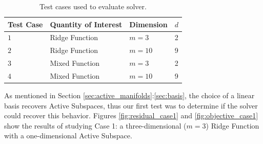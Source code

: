 \documentclass[]{aiaa-tc}%
\begin{document}
\begin{table}
\centering
\begin{tabular}{llll}
\toprule
Test Case & Quantity of Interest & Dimension & $d$\\
\midrule
$1$ & Ridge Function & $m=3$ & 2 \\
$2$ & Ridge Function & $m=10$ & 9 \\
$3$ & Mixed Function & $m=3$ & 2 \\
$4$ & Mixed Function & $m=10$ & 9 \\
\bottomrule
\end{tabular}
\caption{Test cases used to evaluate solver.}
\label{tab:tests}
\end{table}

As mentioned in Section \ref{sec:active_manifolds}:\ref{sec:basis}, the choice of a linear basis recovers Active Subspaces, thus our first test was to determine if the solver could recover this behavior. Figures \ref{fig:residual_case1} and \ref{fig:objective_case1} show the results of studying Case 1: a three-dimensional ($m=3$) Ridge Function with a one-dimensional Active Subspace.
\end{document}
